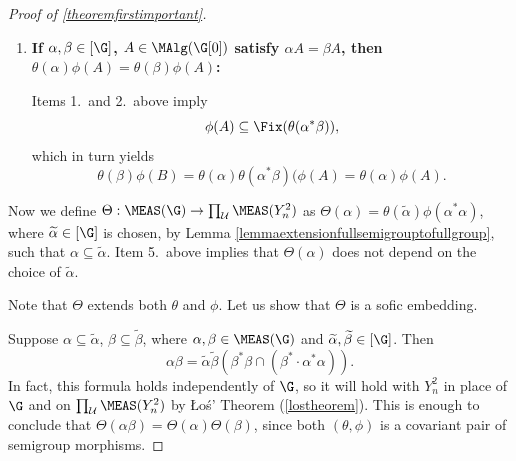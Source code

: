 \begin{proof}[Proof of \ref{theoremfirstimportant}]
\begin{enumerate}
Recall that both $[\G]$ and $\MAlg(\G[0])$ are subsemigroups of $\MEAS(\G)$, and similarly for $\prod_\mathcal{U}\mathfrak{S}_n$ and $\prod_\mathcal{U}\MAlg(Y_n)$ inside $\prod_\mathcal{U}\MEAS(Y_n^2)$.

\item{\bf  If $\alpha,\beta\in[\G]$, $A\in\MAlg(\G[0])$ satisfy $\alpha A=\beta A$, then $\theta(\alpha)\phi(A)=\theta(\beta)\phi(A)$:}

Items 1.\ and 2.\ above imply
\[\phi(A)\subseteq\Fix(\theta(\alpha^*\beta)),\]
which in turn yields
\[\theta(\beta)\phi(B)=\theta(\alpha)\theta(\alpha^*\beta)(\phi(A)=\theta(\alpha)\phi(A).\]
\end{enumerate}

Now we define $\Theta:\MEAS(\G)\to\prod_\mathcal{U}\MEAS(Y_n^2)$ as $\Theta(\alpha)=\theta(\widetilde{\alpha})\phi(\alpha^*\alpha)$, where $\widetilde{\alpha}\in[\G]$ is chosen, by Lemma \ref{lemmaextensionfullsemigrouptofullgroup}, such that $\alpha\subseteq\widetilde{\alpha}$. Item 5.\ above implies that $\Theta(\alpha)$ does not depend on the choice of $\widetilde{\alpha}$.

Note that $\Theta$ extends both $\theta$ and $\phi$. Let us show that $\Theta$ is a sofic embedding.

Suppose $\alpha\subseteq\widetilde{\alpha}$, $\beta\subseteq\widetilde{\beta}$, where $\alpha,\beta\in\MEAS(\G)$ and $\widetilde{\alpha},\widetilde{\beta}\in[\G]$. Then
\[\alpha\beta=\widetilde{\alpha}\widetilde{\beta}\left(\beta^*\beta\cap(\beta^*\cdot\alpha^*\alpha)\right).\]
In fact, this formula holds independently of $\G$, so it will hold with $Y_n^2$ in place of $\G$ and on $\prod_\mathcal{U}\MEAS(Y_n^2)$ by \L o\'{s}' Theorem (\ref{lostheorem}). This is enough to conclude that $\Theta(\alpha\beta)=\Theta(\alpha)\Theta(\beta)$, since both $(\theta,\phi)$ is a covariant pair of semigroup morphisms.%


\end{proof}
